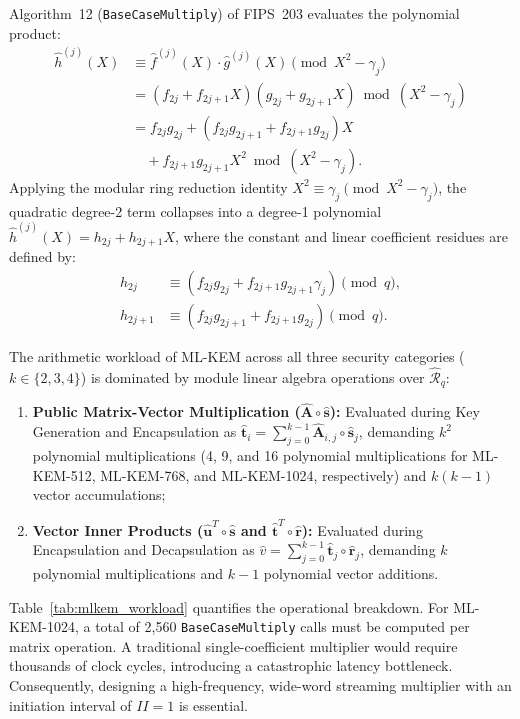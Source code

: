 Algorithm~12 (\texttt{BaseCaseMultiply}) of FIPS~203 evaluates the polynomial product:
\begin{align}
\hat{h}^{(j)}(X) &\equiv \hat{f}^{(j)}(X) \cdot \hat{g}^{(j)}(X) \pmod{X^2 - \gamma_j} \nonumber \\
&= (f_{2j} + f_{2j+1}X)(g_{2j} + g_{2j+1}X) \bmod (X^2 - \gamma_j) \nonumber \\
&= f_{2j}g_{2j} + (f_{2j}g_{2j+1} + f_{2j+1}g_{2j})X \nonumber \\
&\quad + f_{2j+1}g_{2j+1}X^2 \bmod (X^2 - \gamma_j).
\label{eq:basemul_expansion_sec5b}
\end{align}
Applying the modular ring reduction identity $X^2 \equiv \gamma_j \pmod{X^2 - \gamma_j}$, the quadratic degree-2 term collapses into a degree-1 polynomial $\hat{h}^{(j)}(X) = h_{2j} + h_{2j+1}X$, where the constant and linear coefficient residues are defined by:
\begin{align}
h_{2j}   &\equiv \left( f_{2j} g_{2j} + f_{2j+1} g_{2j+1} \gamma_j \right) \pmod q, \label{eq:fips_h2j_sec5b} \\
h_{2j+1} &\equiv \left( f_{2j} g_{2j+1} + f_{2j+1} g_{2j} \right) \pmod q. \label{eq:fips_h2j1_sec5b}
\end{align}

The arithmetic workload of \mbox{ML-KEM} across all three security categories ($k \in \{2, 3, 4\}$) is dominated by module linear algebra operations over $\hat{\mathcal{R}}_q$:
\begin{enumerate}
    \item \textbf{Public Matrix-Vector Multiplication ($\hat{\mathbf{A}} \circ \hat{\mathbf{s}}$):} Evaluated during Key Generation and Encapsulation as $\hat{\mathbf{t}}_i = \sum_{j=0}^{k-1} \hat{\mathbf{A}}_{i,j} \circ \hat{\mathbf{s}}_j$, demanding $k^2$ polynomial multiplications (4, 9, and 16 polynomial multiplications for ML-KEM-512, ML-KEM-768, and ML-KEM-1024, respectively) and $k(k-1)$ vector accumulations;
    \item \textbf{Vector Inner Products ($\hat{\mathbf{u}}^T \circ \hat{\mathbf{s}}$ and $\hat{\mathbf{t}}^T \circ \hat{\mathbf{r}}$):} Evaluated during Encapsulation and Decapsulation as $\hat{v} = \sum_{j=0}^{k-1} \hat{\mathbf{t}}_j \circ \hat{\mathbf{r}}_j$, demanding $k$ polynomial multiplications and $k-1$ polynomial vector additions.
\end{enumerate}

Table~\ref{tab:mlkem_workload} quantifies the operational breakdown. For ML-KEM-1024, a total of 2,560 \texttt{BaseCaseMultiply} calls must be computed per matrix operation. A traditional single-coefficient multiplier would require thousands of clock cycles, introducing a catastrophic latency bottleneck. Consequently, designing a high-frequency, wide-word streaming multiplier with an initiation interval of $II = 1$ is essential.

